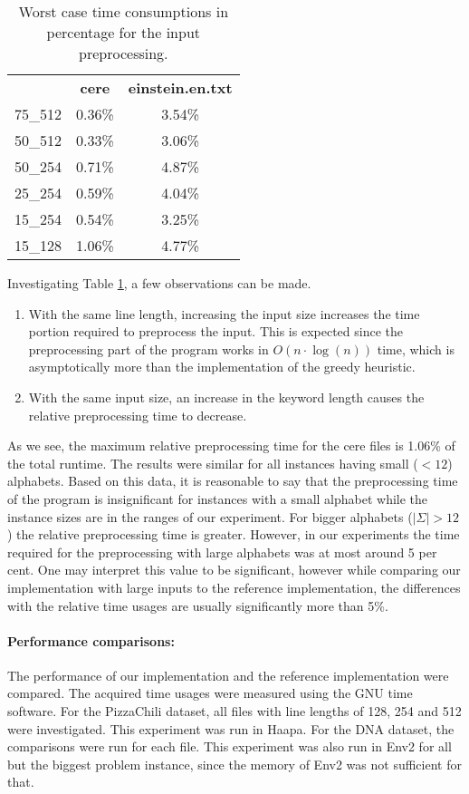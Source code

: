 \documentclass[english,twoside,censored,csm,algorithms-track-2020]{HYthesisML}
\theoremstyle{plain}
\theoremstyle{definition}
\begin{document}
\begin{table}
\begin{centering}
\begin{tabular}{l | c c}
  & \textbf{cere} & \textbf{einstein.en.txt} \\
  75\_512 & 0.36\% & 3.54\% \\
  50\_512 & 0.33\% & 3.06\% \\
  50\_254 & 0.71\% & 4.87\% \\
  25\_254 & 0.59\% & 4.04\% \\
  15\_254 & 0.54\% & 3.25\% \\
  15\_128 & 1.06\% & 4.77\% \\
\end{tabular}
  \caption{Worst case time consumptions in percentage for the input preprocessing.}
  \label{table-duplicate-time}
\end{centering}
\end{table}
Investigating Table \ref{table-duplicate-time}, a few observations can be made.

\begin{enumerate}
\item With the same line length, increasing the input size increases the time portion required to preprocess the input. This is expected since the preprocessing part of the program works in $O(n\cdot\log(n))$ time, which is asymptotically more than the implementation of the greedy heuristic.
\item With the same input size, an increase in the keyword length causes the relative preprocessing time to decrease. 
\end{enumerate}

As we see, the maximum relative preprocessing time for the cere files is 1.06\% of the total runtime.
The results were similar for all instances having small ($<12$) alphabets. Based on this data,
it is reasonable to say that the preprocessing time of the program is insignificant for instances
with a small alphabet while the instance sizes are in the ranges of our experiment. For bigger
alphabets ($|\Sigma|>12$) the relative preprocessing time is greater. However, in our experiments
the time required for the preprocessing with large alphabets was at most around 5 per cent. One may
interpret this value to be significant, however while comparing our implementation with large
inputs to the reference implementation, the differences with the relative time usages are usually
significantly more than 5\%.


\paragraph{Performance comparisons:}
The performance of our implementation and the reference implementation were compared. The acquired
time usages were measured using the GNU time software. For the PizzaChili dataset, all files with line
lengths of 128, 254 and 512 were investigated. This experiment was run in Haapa. For the DNA dataset,
the comparisons were run for each file. This experiment was also run in Env2 for all but the
biggest problem instance, since the memory of Env2 was not sufficient for that.
\end{document}
